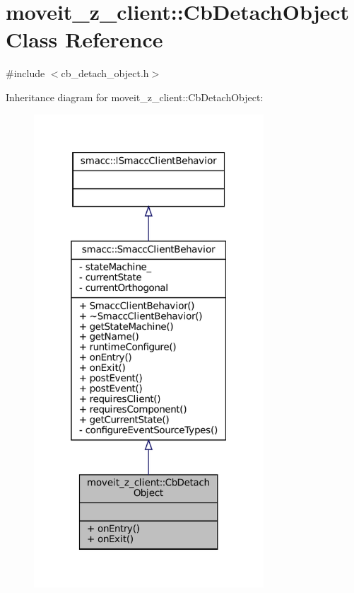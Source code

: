 \hypertarget{classmoveit__z__client_1_1CbDetachObject}{}\section{moveit\+\_\+z\+\_\+client\+:\+:Cb\+Detach\+Object Class Reference}
\label{classmoveit__z__client_1_1CbDetachObject}


{\ttfamily \#include $<$cb\+\_\+detach\+\_\+object.\+h$>$}



Inheritance diagram for moveit\+\_\+z\+\_\+client\+:\+:Cb\+Detach\+Object\+:
\nopagebreak
\begin{figure}[H]
\begin{center}
\leavevmode
\includegraphics[width=244pt]{classmoveit__z__client_1_1CbDetachObject__inherit__graph}
\end{center}
\end{figure}


